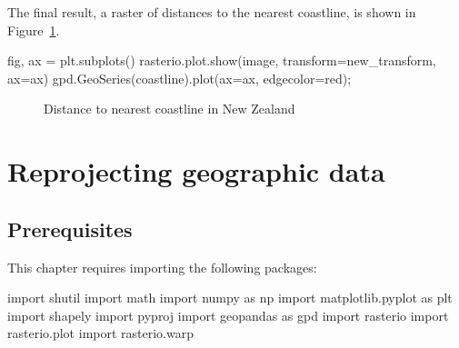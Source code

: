 \documentclass[
  letterpaper,
]{krantz}
\newenvironment{Shaded}{\begin{snugshade}}{\end{snugshade}}
\newcommand{\ImportTok}[1]{\textcolor[rgb]{0.00,0.46,0.62}{#1}}
\newcommand{\NormalTok}[1]{\textcolor[rgb]{0.00,0.23,0.31}{#1}}
\newcommand{\OperatorTok}[1]{\textcolor[rgb]{0.37,0.37,0.37}{#1}}
\newcommand{\StringTok}[1]{\textcolor[rgb]{0.13,0.47,0.30}{#1}}
\begin{document}
The final result, a raster of distances to the nearest coastline, is
shown in Figure~\ref{fig-raster-distances2}.

\begin{Shaded}
\begin{Highlighting}[]
\NormalTok{fig, ax }\OperatorTok{=}\NormalTok{ plt.subplots()}
\NormalTok{rasterio.plot.show(image, transform}\OperatorTok{=}\NormalTok{new\_transform, ax}\OperatorTok{=}\NormalTok{ax)}
\NormalTok{gpd.GeoSeries(coastline).plot(ax}\OperatorTok{=}\NormalTok{ax, edgecolor}\OperatorTok{=}\StringTok{\textquotesingle{}red\textquotesingle{}}\NormalTok{)}\OperatorTok{;}
\end{Highlighting}
\end{Shaded}

\begin{figure}[H]


\caption{\label{fig-raster-distances2}Distance to nearest coastline in
New Zealand}

\end{figure}%


\chapter{Reprojecting geographic data}\label{sec-reproj-geo-data}

\section*{Prerequisites}\label{prerequisites-5}


This chapter requires importing the following packages:

\begin{Shaded}
\begin{Highlighting}[]
\ImportTok{import}\NormalTok{ shutil}
\ImportTok{import}\NormalTok{ math}
\ImportTok{import}\NormalTok{ numpy }\ImportTok{as}\NormalTok{ np}
\ImportTok{import}\NormalTok{ matplotlib.pyplot }\ImportTok{as}\NormalTok{ plt}
\ImportTok{import}\NormalTok{ shapely}
\ImportTok{import}\NormalTok{ pyproj}
\ImportTok{import}\NormalTok{ geopandas }\ImportTok{as}\NormalTok{ gpd}
\ImportTok{import}\NormalTok{ rasterio}
\ImportTok{import}\NormalTok{ rasterio.plot}
\ImportTok{import}\NormalTok{ rasterio.warp}
\end{Highlighting}
\end{Shaded}
\end{document}
